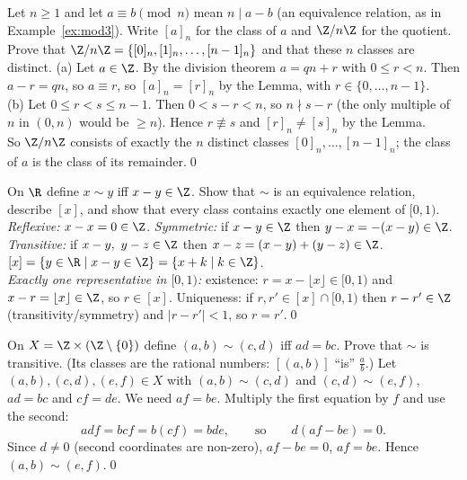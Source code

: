 \begin{hexample}\label{ex:znz}
Let $n\ge1$ and let $a\equiv b\pmod n$ mean $n\mid a-b$ (an equivalence relation, as in Example~\ref{ex:mod3}). Write $[a]_n$ for the class of $a$ and $\Z/n\Z$ for the quotient. Prove that $\Z/n\Z=\{[0]_n,[1]_n,\dots,[n-1]_n\}$ and that these $n$ classes are distinct.
\solution
(a) Let $a\in\Z$. By the division theorem $a=qn+r$ with $0\le r<n$. Then $a-r=qn$, so $a\equiv r$, so $[a]_n=[r]_n$ by the Lemma, with $r\in\{0,\dots,n-1\}$.\\
(b) Let $0\le r<s\le n-1$. Then $0<s-r<n$, so $n\nmid s-r$ (the only multiple of $n$ in $(0,n)$ would be $\ge n$). Hence $r\not\equiv s$ and $[r]_n\neq[s]_n$ by the Lemma.\\
So $\Z/n\Z$ consists of exactly the $n$ distinct classes $[0]_n,\dots,[n-1]_n$; the class of $a$ is the class of its remainder.\qed
\end{hexample}

\begin{hexample}
On $\R$ define $x\sim y$ iff $x-y\in\Z$. Show that $\sim$ is an equivalence relation, describe $[x]$, and show that every class contains exactly one element of $[0,1)$.
\solution
\emph{Reflexive:} $x-x=0\in\Z$. \emph{Symmetric:} if $x-y\in\Z$ then $y-x=-(x-y)\in\Z$. \emph{Transitive:} if $x-y,\ y-z\in\Z$ then $x-z=(x-y)+(y-z)\in\Z$.\\
$[x]=\{y\in\R\mid x-y\in\Z\}=\{x+k\mid k\in\Z\}$.\\
\emph{Exactly one representative in $[0,1)$:} existence: $r=x-\lfloor x\rfloor\in[0,1)$ and $x-r=\lfloor x\rfloor\in\Z$, so $r\in[x]$. Uniqueness: if $r,r'\in[x]\cap[0,1)$ then $r-r'\in\Z$ (transitivity/symmetry) and $|r-r'|<1$, so $r=r'$.\qed
\end{hexample}

\begin{hexample}
On $X=\Z\times(\Z\setminus\{0\})$ define $(a,b)\sim(c,d)$ iff $ad=bc$. Prove that $\sim$ is transitive. (Its classes are the rational numbers: $[(a,b)]$ ``is'' $\frac ab$.)
\solution
Let $(a,b),(c,d),(e,f)\in X$ with $(a,b)\sim(c,d)$ and $(c,d)\sim(e,f)$, \ie $ad=bc$ and $cf=de$. We need $af=be$. Multiply the first equation by $f$ and use the second:
\[
adf=bcf=b(cf)=bde,\qquad\text{so}\qquad d(af-be)=0 .
\]
Since $d\neq0$ (second coordinates are non-zero), $af-be=0$, \ie $af=be$. Hence $(a,b)\sim(e,f)$.\qed
\end{hexample}

